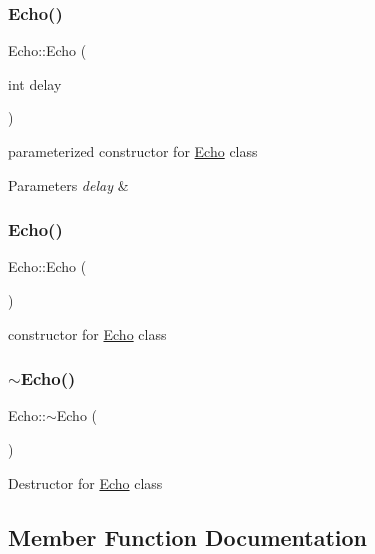 \subsubsection{\texorpdfstring{Echo()}{Echo()}\hspace{0.1cm}{\footnotesize\ttfamily [1/2]}}
{\footnotesize\ttfamily Echo\+::\+Echo (\begin{DoxyParamCaption}\item[{int}]{delay }\end{DoxyParamCaption})}

parameterized constructor for \hyperlink{classEcho}{Echo} class 
\begin{DoxyParams}{Parameters}
{\em delay} & \\
\hline
\end{DoxyParams}
\mbox{\label{classEcho_ababd42898feed0775f5234d53fe9bff1}} 
\subsubsection{\texorpdfstring{Echo()}{Echo()}\hspace{0.1cm}{\footnotesize\ttfamily [2/2]}}
{\footnotesize\ttfamily Echo\+::\+Echo (\begin{DoxyParamCaption}{ }\end{DoxyParamCaption})}

constructor for \hyperlink{classEcho}{Echo} class \mbox{\label{classEcho_a03c51e9ff426744f7ae68a9aac8614c8}} 
\subsubsection{\texorpdfstring{$\sim$\+Echo()}{~Echo()}}
{\footnotesize\ttfamily Echo\+::$\sim$\+Echo (\begin{DoxyParamCaption}{ }\end{DoxyParamCaption})\hspace{0.3cm}{\ttfamily [virtual]}}

Destructor for \hyperlink{classEcho}{Echo} class 

\subsection{Member Function Documentation}
\mbox{\label{classEcho_a57e19c9232f9bb96ccd78ba4bb68d6c9}} 

